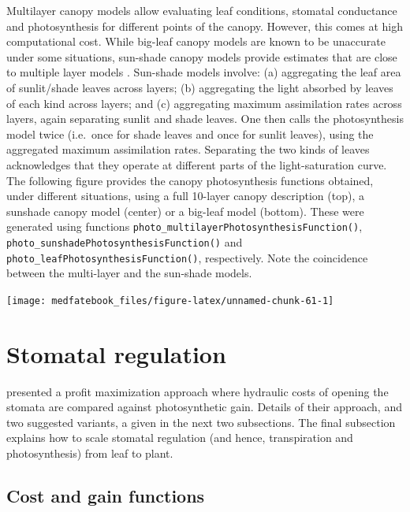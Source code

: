\documentclass[]{book}
\begin{document}
Multilayer canopy models allow evaluating leaf conditions, stomatal
conductance and photosynthesis for different points of the canopy.
However, this comes at high computational cost. While big-leaf canopy
models are known to be unaccurate under some situations, sun-shade
canopy models \citep{DePury1997} provide estimates that are close to
multiple layer models \citep{Hikosaka2016}. Sun-shade models involve:
(a) aggregating the leaf area of sunlit/shade leaves across layers; (b)
aggregating the light absorbed by leaves of each kind across layers; and
(c) aggregating maximum assimilation rates across layers, again
separating sunlit and shade leaves. One then calls the photosynthesis
model twice (i.e.~once for shade leaves and once for sunlit leaves),
using the aggregated maximum assimilation rates. Separating the two
kinds of leaves acknowledges that they operate at different parts of the
light-saturation curve. The following figure provides the canopy
photosynthesis functions obtained, under different situations, using a
full 10-layer canopy description (top), a sunshade canopy model (center)
or a big-leaf model (bottom). These were generated using functions
\texttt{photo\_multilayerPhotosynthesisFunction()},
\texttt{photo\_sunshadePhotosynthesisFunction()} and
\texttt{photo\_leafPhotosynthesisFunction()}, respectively. Note the
coincidence between the multi-layer and the sun-shade models.

\begin{center}\texttt{[image: medfatebook\_files/figure-latex/unnamed-chunk-61-1]} \end{center}

\section{Stomatal regulation}\label{stomatal-regulation}

\citet{Sperry2016} presented a profit maximization approach where
hydraulic costs of opening the stomata are compared against
photosynthetic gain. Details of their approach, and two suggested
variants, a given in the next two subsections. The final subsection
explains how to scale stomatal regulation (and hence, transpiration and
photosynthesis) from leaf to plant.

\subsection{Cost and gain functions}\label{cost-and-gain-functions}
\end{document}
